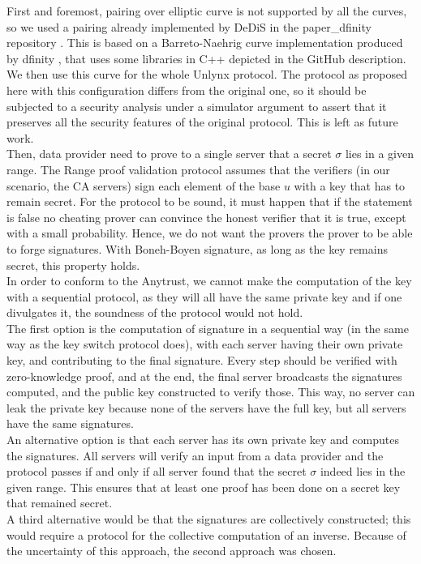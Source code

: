 \documentclass{article}
\begin{document}
First and foremost, pairing over elliptic curve is not supported by all the curves, so we used a pairing already implemented by DeDiS in the paper\_dfinity repository \cite{dfinitydedis}.  This is based on a Barreto-Naehrig curve implementation produced by dfinity \cite{dfinity}, that uses some libraries in C++ depicted in the GitHub description. We then use this curve for the whole Unlynx protocol. The protocol as proposed here with this configuration differs from the original one, so it should be subjected to a security analysis under a simulator argument to assert that it preserves all the security features of the original protocol. This is left as future work.\\

Then, data provider need to prove to a single server that a secret $\sigma$ lies in a given range. 
The Range proof validation protocol assumes that the verifiers (in our scenario, the CA servers) sign each element of the base $u$ with a key that has to remain secret.
For the protocol to be sound, it must happen that if the statement is false no cheating prover can convince the honest verifier that it is true, except with a small probability. Hence, we do not want the provers the prover to be able to forge signatures.
With Boneh-Boyen signature, as long as the key remains secret, this property holds.\\
In order to conform to the Anytrust, we cannot make the computation of the key with a sequential protocol, as they will all have the same private key and if one divulgates it, the soundness of the protocol would not hold. \\
The first option is the computation of signature in a sequential way (in the same way as the key switch protocol does), with each server having their own private key, and contributing to the final signature. Every step should be verified with zero-knowledge proof, and at the end, the final server broadcasts the signatures computed, and the public key constructed to verify those. This way, no server can leak the private key because none of the servers have the full key, but all servers have the same signatures. \\
An alternative option is that each server has its own private key and computes the signatures. All servers will verify an input from a data provider and the protocol passes if and only if all server found that the secret $\sigma$ indeed lies in the given range. This ensures that at least one proof has been done on a secret key that remained secret.\\
A third alternative would be that the signatures are collectively constructed; this would require a protocol for the collective computation of an inverse. Because of the uncertainty of this approach, the second approach was chosen.
\end{document}
